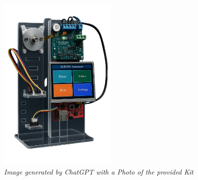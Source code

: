 \documentclass[a4paper, 11pt, titlepage]{article}
\begin{document}
\begin{titlepage}
\vfill\vfill\vfill %

\includegraphics[width=0.43\textwidth]{images/electricVehicle-removebg.png}\\
\small\textit{Image generated by ChatGPT with a Photo of the provided Kit \parencite{openai2024}}

	
\end{titlepage}
{\hypersetup{linkcolor=black} 
\thispagestyle{empty}
\tableofcontents
\listoffigures
\listoftables
\clearpage
}



\end{document}
